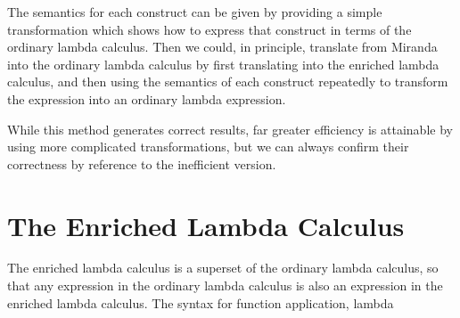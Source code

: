 

The semantics for each construct can be given by providing a simple transformation which shows how to express that construct in terms of the ordinary lambda calculus. Then we could, in principle, translate from Miranda into the ordinary lambda calculus by first translating into the enriched lambda calculus, and then using the semantics of each construct repeatedly to transform the expression into an ordinary lambda expression.


While this method generates correct results, far greater efficiency is attainable by using more complicated transformations, but we can always confirm their correctness by reference to the inefficient version.

\section{The Enriched Lambda Calculus}
The enriched lambda calculus is a superset of the ordinary lambda calculus, so that any expression in the ordinary lambda calculus is also an expression in the enriched lambda calculus. The syntax for function application, lambda
